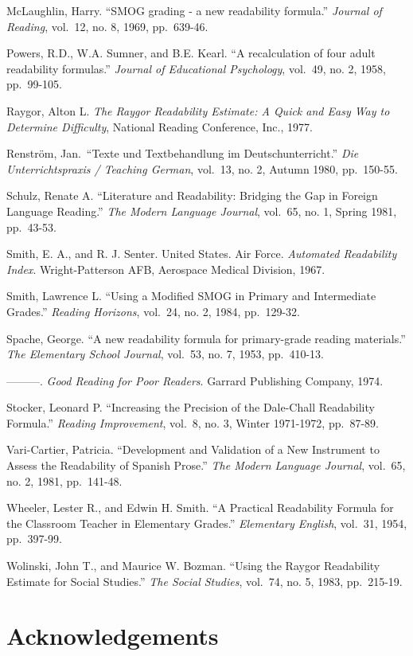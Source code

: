 \documentclass[
]{book}
\theoremstyle{definition}
\theoremstyle{definition}
\theoremstyle{definition}
\theoremstyle{definition}
\theoremstyle{remark}
\begin{document}
McLaughlin, Harry. ``SMOG grading - a new readability formula.'' \emph{Journal of Reading}, vol.~12, no. 8, 1969, pp.~639-46.

Powers, R.D., W.A. Sumner, and B.E. Kearl. ``A recalculation of four adult readability formulas.'' \emph{Journal of Educational Psychology}, vol.~49, no. 2, 1958, pp.~99-105.

Raygor, Alton L. \emph{The Raygor Readability Estimate: A Quick and Easy Way to Determine Difficulty}, National Reading Conference, Inc., 1977.

Renström, Jan.~``Texte und Textbehandlung im Deutschunterricht.'' \emph{Die Unterrichtspraxis / Teaching German}, vol.~13, no. 2, Autumn 1980, pp.~150-55.

Schulz, Renate A. ``Literature and Readability: Bridging the Gap in Foreign Language Reading.'' \emph{The Modern Language Journal}, vol.~65, no. 1, Spring 1981, pp.~43-53.

Smith, E. A., and R. J. Senter. United States. Air Force. \emph{Automated Readability Index}. Wright-Patterson AFB, Aerospace Medical Division, 1967.

Smith, Lawrence L. ``Using a Modified SMOG in Primary and Intermediate Grades.'' \emph{Reading Horizons}, vol.~24, no. 2, 1984, pp.~129-32.

Spache, George. ``A new readability formula for primary-grade reading materials.'' \emph{The Elementary School Journal}, vol.~53, no. 7, 1953, pp.~410-13.

---------. \emph{Good Reading for Poor Readers}. Garrard Publishing Company, 1974.

Stocker, Leonard P. ``Increasing the Precision of the Dale-Chall Readability Formula.'' \emph{Reading Improvement}, vol.~8, no. 3, Winter 1971-1972, pp.~87-89.

Vari-Cartier, Patricia. ``Development and Validation of a New Instrument to Assess the Readability of Spanish Prose.'' \emph{The Modern Language Journal}, vol.~65, no. 2, 1981, pp.~141-48.

Wheeler, Lester R., and Edwin H. Smith. ``A Practical Readability Formula for the Classroom Teacher in Elementary Grades.'' \emph{Elementary English}, vol.~31, 1954, pp.~397-99.

Wolinski, John T., and Maurice W. Bozman. ``Using the Raygor Readability Estimate for Social Studies.'' \emph{The Social Studies}, vol.~74, no. 5, 1983, pp.~215-19.

\hypertarget{acknowledgements}{%
\chapter{Acknowledgements}\label{acknowledgements}}
\end{document}
